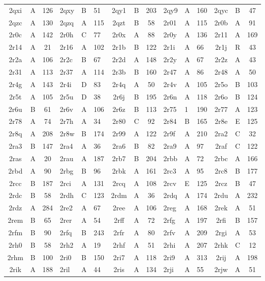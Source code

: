 \begin{longtable}{|c|c|c| a|a|a| c|c|c| a|a|a| c|c|c|}
2qxi & A & 126 & 2qxy & B & 51 & 2qy1 & B & 203 & 2qy9 & A & 160 & 2qyc & B & 47\\
2qzc & A & 130 & 2qzq & A & 115 & 2qzt & B & 58 & 2r01 & A & 115 & 2r0b & A & 91\\
2r0c & A & 142 & 2r0h & C & 77 & 2r0x & A & 88 & 2r0y & A & 136 & 2r11 & A & 169\\
2r14 & A & 21 & 2r16 & A & 102 & 2r1b & B & 122 & 2r1i & A & 66 & 2r1j & R & 43\\
2r2a & A & 106 & 2r2c & B & 67 & 2r2d & A & 148 & 2r2y & A & 67 & 2r2z & A & 43\\
2r31 & A & 113 & 2r37 & A & 114 & 2r3b & B & 160 & 2r47 & A & 86 & 2r48 & A & 50\\
2r4g & A & 143 & 2r4i & D & 83 & 2r4q & A & 50 & 2r4v & A & 105 & 2r5o & B & 103\\
2r5t & A & 105 & 2r5u & D & 38 & 2r6j & B & 195 & 2r6n & A & 118 & 2r6o & B & 124\\
2r6u & B & 61 & 2r6v & A & 106 & 2r6z & B & 113 & 2r75 & 1 & 190 & 2r77 & A & 123\\
2r78 & A & 74 & 2r7h & A & 34 & 2r80 & C & 92 & 2r84 & B & 165 & 2r8e & E & 125\\
2r8q & A & 208 & 2r8w & B & 174 & 2r99 & A & 122 & 2r9f & A & 210 & 2ra2 & C & 32\\
2ra3 & B & 147 & 2ra4 & A & 36 & 2ra6 & B & 82 & 2ra9 & A & 97 & 2raf & C & 122\\
2ras & A & 20 & 2rau & A & 187 & 2rb7 & B & 204 & 2rbb & A & 72 & 2rbc & A & 166\\
2rbd & A & 90 & 2rbg & B & 96 & 2rbk & A & 161 & 2rc3 & A & 95 & 2rc8 & B & 177\\
2rcc & B & 187 & 2rci & A & 131 & 2rcq & A & 108 & 2rcv & E & 125 & 2rcz & B & 47\\
2rdc & B & 58 & 2rdh & C & 123 & 2rdm & A & 36 & 2rdq & A & 174 & 2rdu & A & 232\\
2rdz & A & 284 & 2re2 & A & 67 & 2ree & A & 106 & 2reg & A & 168 & 2rek & A & 51\\
2rem & B & 65 & 2rer & A & 54 & 2rff & A & 72 & 2rfg & A & 197 & 2rfi & B & 157\\
2rfm & B & 90 & 2rfq & B & 243 & 2rfr & A & 80 & 2rfv & A & 209 & 2rgi & A & 53\\
2rh0 & B & 58 & 2rh2 & A & 19 & 2rhf & A & 51 & 2rhi & A & 207 & 2rhk & C & 12\\
2rhm & B & 100 & 2ri0 & B & 150 & 2ri7 & A & 118 & 2ri9 & A & 313 & 2rij & A & 198\\
2rik & A & 188 & 2ril & A & 44 & 2ris & A & 134 & 2rji & A & 55 & 2rjw & A & 51\\

\end{longtable}

